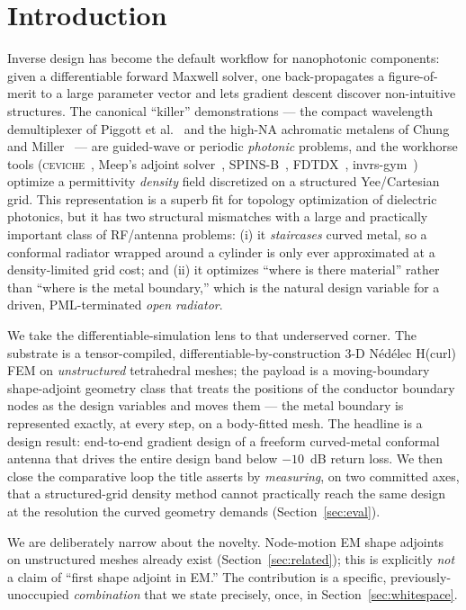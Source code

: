\documentclass{anvil-paper}
\begin{document}
\section{Introduction}
\label{sec:intro}

Inverse design has become the default workflow for nanophotonic components:
given a differentiable forward Maxwell solver, one back-propagates a
figure-of-merit to a large parameter vector and lets gradient descent discover
non-intuitive structures. The canonical ``killer'' demonstrations --- the
compact wavelength demultiplexer of Piggott et al.~\cite{piggott2015} and the
high-NA achromatic metalens of Chung and Miller~\cite{chung2020} --- are
guided-wave or periodic \emph{photonic} problems, and the workhorse tools
(\textsc{ceviche}~\cite{hughes2019forward}, Meep's adjoint
solver~\cite{hammond2022meepadjoint}, SPINS-B~\cite{su_spinsb},
FDTDX~\cite{fdtdx,mahlau2026fdtdx}, invrs-gym~\cite{invrsgym}) optimize a permittivity
\emph{density} field discretized on a structured Yee/Cartesian grid. This
representation is a superb fit for topology optimization of dielectric
photonics, but it has two structural mismatches with a large and practically
important class of RF/antenna problems: (i) it \emph{staircases} curved metal,
so a conformal radiator wrapped around a cylinder is only ever approximated at a
density-limited grid cost; and (ii) it optimizes ``where is there material''
rather than ``where is the metal boundary,'' which is the natural design
variable for a driven, PML-terminated \emph{open radiator}.

We take the differentiable-simulation lens to that underserved corner. The
substrate is a tensor-compiled, differentiable-by-construction 3-D N\'ed\'elec
H(curl) FEM on \emph{unstructured} tetrahedral meshes; the payload is a
moving-boundary shape-adjoint geometry class that treats the positions of the
conductor boundary nodes as the design variables and moves them --- the metal
boundary is represented exactly, at every step, on a body-fitted mesh. The
headline is a design result: end-to-end gradient design of a freeform
curved-metal conformal antenna that drives the entire design band below
$-10$~dB return loss. We then close the comparative loop the title asserts by
\emph{measuring}, on two committed axes, that a structured-grid density method
cannot practically reach the same design at the resolution the curved geometry
demands (Section~\ref{sec:eval}).

We are deliberately narrow about the novelty. Node-motion EM shape adjoints on
unstructured meshes already exist (Section~\ref{sec:related}); this is
explicitly \emph{not} a claim of ``first shape adjoint in EM.'' The contribution
is a specific, previously-unoccupied \emph{combination} that we state precisely,
once, in Section~\ref{sec:whitespace}.
\end{document}
